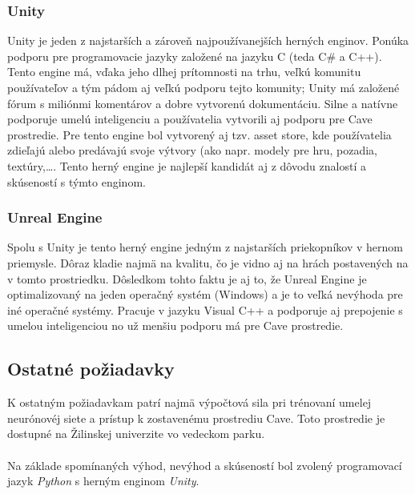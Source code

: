 \subsubsection{Unity}
Unity je jeden z najstarších a zároveň najpoužívanejších herných enginov.\cite{game_engine_unity}
Ponúka podporu pre programovacie jazyky založené na jazyku C (teda C\# a C++).
Tento engine má, vďaka jeho dlhej prítomnosti na trhu, veľkú komunitu používateľov a tým pádom aj veľkú podporu tejto
komunity;
Unity má založené fórum s miliónmi komentárov a dobre vytvorenú dokumentáciu.
Silne a natívne podporuje umelú inteligenciu\cite{game_engine_unity_ml_agents} a používatelia vytvorili aj podporu pre
Cave prostredie\cite{game_engine_unity_kave}.
Pre tento engine bol vytvorený aj tzv. asset store, kde používatelia zdieľajú alebo predávajú svoje výtvory (ako napr.
modely pre hru, pozadia, textúry,\dots.
Tento herný engine je najlepší kandidát aj z dôvodu znalostí a skúseností s týmto enginom.

\subsubsection{Unreal Engine}
Spolu s Unity je tento herný engine jedným z najstarších priekopníkov v hernom
priemysle.\cite{game_engine_unreal_engine}
Dôraz kladie najmä na kvalitu, čo je vidno aj na hrách postavených na v tomto prostriedku.
Dôsledkom tohto faktu je aj to, že Unreal Engine je optimalizovaný na jeden operačný systém (Windows) a je to veľká
nevýhoda pre iné operačné systémy.
Pracuje v jazyku Visual C++ a podporuje aj prepojenie s umelou inteligenciou no už menšiu podporu má pre Cave
prostredie.

\subsection{Ostatné požiadavky}\label{subsec:requirements-other}

K ostatným požiadavkam patrí najmä výpočtová sila pri trénovaní umelej neurónovéj siete a prístup k zostavenému
prostrediu Cave.
Toto prostredie je dostupné na Žilinskej univerzite vo vedeckom parku.
\\
\\
Na základe spomínaných výhod, nevýhod a skúseností bol zvolený programovací jazyk \emph{Python} s herným enginom
\emph{Unity}.

